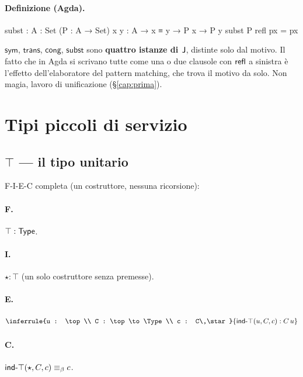 \paragraph{Definizione (Agda).}
\begin{agda}
subst : {A : Set} (P : A → Set) {x y : A} → x ≡ y → P x → P y
subst P refl px = px
\end{agda}

\begin{oss}
$\mathsf{sym}$, $\mathsf{trans}$, $\mathsf{cong}$, $\mathsf{subst}$ sono \textbf{quattro istanze di $\mathsf{J}$}, distinte solo dal motivo. Il fatto che in Agda si scrivano tutte come una o due clausole con $\mathsf{refl}$ a sinistra \`e l'effetto dell'elaboratore del pattern matching, che trova il motivo da solo. Non magia, lavoro di unificazione (\S\ref{cap:prima}).
\end{oss}

\section{Tipi piccoli di servizio}\label{sec:tipi-piccoli}

\subsection*{$\top$ --- il tipo unitario}

F-I-E-C completa (un costruttore, nessuna ricorsione):

\paragraph{F.} $\top : \mathsf{Type}$.

\paragraph{I.} $\star : \top$ (un solo costruttore senza premesse).

\paragraph{E.}
\[
\inferrule{u : \top \\ C : \top \to \Type \\ c : C\,\star}{\mathsf{ind}\text{-}\top(u, C, c) : C\,u}
\]

\paragraph{C.} $\mathsf{ind}\text{-}\top(\star, C, c) \equiv_{\beta} c$.

